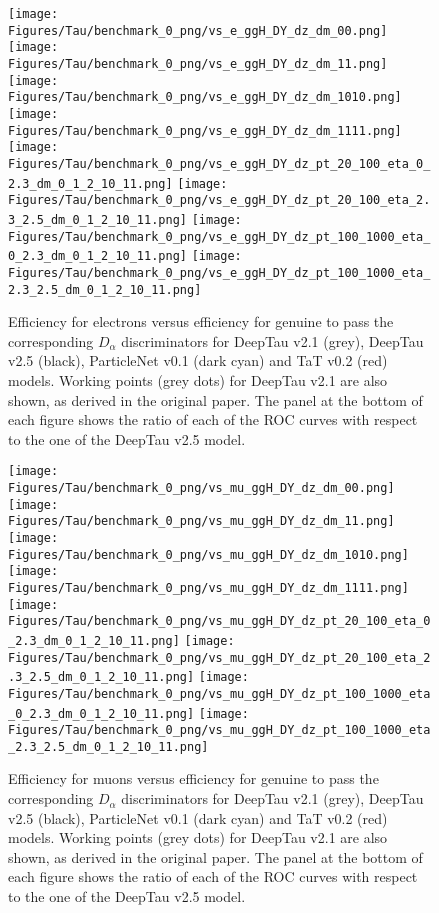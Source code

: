 \begin{figure}[H]
    \centering
    \texttt{[image: Figures/Tau/benchmark\_0\_png/vs\_e\_ggH\_DY\_dz\_dm\_00.png]}
    \texttt{[image: Figures/Tau/benchmark\_0\_png/vs\_e\_ggH\_DY\_dz\_dm\_11.png]}
    \texttt{[image: Figures/Tau/benchmark\_0\_png/vs\_e\_ggH\_DY\_dz\_dm\_1010.png]}
    \texttt{[image: Figures/Tau/benchmark\_0\_png/vs\_e\_ggH\_DY\_dz\_dm\_1111.png]}
    \texttt{[image: Figures/Tau/benchmark\_0\_png/vs\_e\_ggH\_DY\_dz\_pt\_20\_100\_eta\_0\_2.3\_dm\_0\_1\_2\_10\_11.png]}
    \texttt{[image: Figures/Tau/benchmark\_0\_png/vs\_e\_ggH\_DY\_dz\_pt\_20\_100\_eta\_2.3\_2.5\_dm\_0\_1\_2\_10\_11.png]}
    \texttt{[image: Figures/Tau/benchmark\_0\_png/vs\_e\_ggH\_DY\_dz\_pt\_100\_1000\_eta\_0\_2.3\_dm\_0\_1\_2\_10\_11.png]}
    \texttt{[image: Figures/Tau/benchmark\_0\_png/vs\_e\_ggH\_DY\_dz\_pt\_100\_1000\_eta\_2.3\_2.5\_dm\_0\_1\_2\_10\_11.png]}
    \caption{Efficiency for electrons versus efficiency for genuine \tauh to pass the corresponding $D_\alpha$ discriminators for DeepTau v2.1 (grey), DeepTau v2.5 (black), ParticleNet v0.1 (dark cyan) and TaT v0.2 (red) models. Working points (grey dots) for DeepTau v2.1 are also shown, as derived in the original paper. The panel at the bottom of each figure shows the ratio of each of the ROC curves with respect to the one of the DeepTau v2.5 model.}
\end{figure}

\begin{figure}[H]
    \centering
    \texttt{[image: Figures/Tau/benchmark\_0\_png/vs\_mu\_ggH\_DY\_dz\_dm\_00.png]}
    \texttt{[image: Figures/Tau/benchmark\_0\_png/vs\_mu\_ggH\_DY\_dz\_dm\_11.png]}
    \texttt{[image: Figures/Tau/benchmark\_0\_png/vs\_mu\_ggH\_DY\_dz\_dm\_1010.png]}
    \texttt{[image: Figures/Tau/benchmark\_0\_png/vs\_mu\_ggH\_DY\_dz\_dm\_1111.png]}
    \texttt{[image: Figures/Tau/benchmark\_0\_png/vs\_mu\_ggH\_DY\_dz\_pt\_20\_100\_eta\_0\_2.3\_dm\_0\_1\_2\_10\_11.png]}
    \texttt{[image: Figures/Tau/benchmark\_0\_png/vs\_mu\_ggH\_DY\_dz\_pt\_20\_100\_eta\_2.3\_2.5\_dm\_0\_1\_2\_10\_11.png]}
    \texttt{[image: Figures/Tau/benchmark\_0\_png/vs\_mu\_ggH\_DY\_dz\_pt\_100\_1000\_eta\_0\_2.3\_dm\_0\_1\_2\_10\_11.png]}
    \texttt{[image: Figures/Tau/benchmark\_0\_png/vs\_mu\_ggH\_DY\_dz\_pt\_100\_1000\_eta\_2.3\_2.5\_dm\_0\_1\_2\_10\_11.png]}
    \caption{Efficiency for muons versus efficiency for genuine \tauh to pass the corresponding $D_\alpha$ discriminators for DeepTau v2.1 (grey), DeepTau v2.5 (black), ParticleNet v0.1 (dark cyan) and TaT v0.2 (red) models. Working points (grey dots) for DeepTau v2.1 are also shown, as derived in the original paper. The panel at the bottom of each figure shows the ratio of each of the ROC curves with respect to the one of the DeepTau v2.5 model.}
\end{figure}

